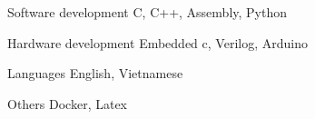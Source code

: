 

\begin{cvskills}




  \cvskill
    {Software development} %
    {C, C++, Assembly, Python} %

  \cvskill
    {Hardware development} %
    {Embedded c, Verilog, Arduino} %

  \cvskill
    {Languages} %
    {English, Vietnamese} %

  \cvskill
    {Others} %
    {Docker, Latex} %

\end{cvskills}
